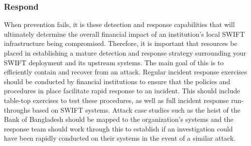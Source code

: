 \documentclass[12pt]{article}
\begin{document}
        \subsubsection{Respond}
        When prevention fails, it is these detection and response capabilities that will ultimately determine the overall financial impact of an institution’s local SWIFT infrastructure being compromised. Therefore, it is important that resources be placed in establishing a mature detection and response strategy surrounding your SWIFT deployment and its upstream systems. The main goal of this is to efficiently contain and recover from an attack.
        Regular incident response exercises should be conducted by financial institutions to ensure that the policies and procedures in place facilitate rapid response to an incident. This should include table-top exercises to test these procedures, as well as full incident response run-throughs based on SWIFT systems. Attack case studies such as the heist of the Bank of Bangladesh should be mapped to the organization’s systems and the response team should work through this to establish if an investigation could have been rapidly conducted on their systems in the event of a similar attack.
        
      

    \begin{flushright}
    \end{flushright}
    \newpage
    \printbibliography[heading=bibintoc]
\end{document}
